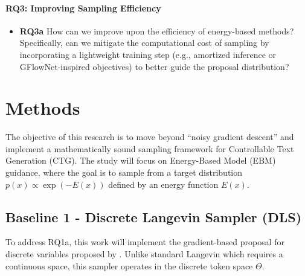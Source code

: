 \documentclass[11pt]{article}
\begin{document}
\paragraph{RQ3: Improving Sampling Efficiency}
\begin{itemize}
    \item \textbf{RQ3a}
    How can we improve upon the efficiency of energy-based methods? Specifically, can we mitigate the computational cost of sampling by incorporating a lightweight training step (e.g., amortized inference or GFlowNet-inspired objectives) to better guide the proposal distribution?
\end{itemize}



\section{Methods}
The objective of this research is to move beyond ``noisy gradient descent'' and implement a mathematically sound sampling framework for Controllable Text Generation (CTG). The study will focus on Energy-Based Model (EBM) guidance, where the goal is to sample from a target distribution $p(x) \propto \exp(-E(x))$ defined by an energy function $E(x)$.
\subsection{Baseline 1  - Discrete Langevin Sampler (DLS)}


To address RQ1a, this work will implement the gradient-based proposal for discrete variables proposed by \cite{zhang2022langevinlikesamplerdiscretedistributions}. Unlike standard Langevin which requires a continuous space, this sampler operates in the discrete token space $\Theta$.
\end{document}
